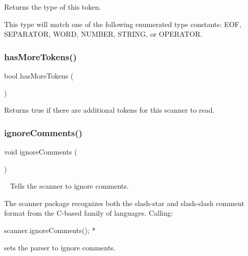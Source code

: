 Returns the type of this token. 

This type will match one of the following enumerated type constants\+: {\ttfamily E\+OF}, {\ttfamily S\+E\+P\+A\+R\+A\+T\+OR}, {\ttfamily W\+O\+RD}, {\ttfamily N\+U\+M\+B\+ER}, {\ttfamily S\+T\+R\+I\+NG}, or {\ttfamily O\+P\+E\+R\+A\+T\+OR}. \mbox{\label{classTokenScanner_af690597352ca6f48a9f86b527cd754da}} 
\subsubsection{\texorpdfstring{has\+More\+Tokens()}{hasMoreTokens()}}
{\footnotesize\ttfamily bool has\+More\+Tokens (\begin{DoxyParamCaption}{ }\end{DoxyParamCaption})}



Returns {\ttfamily true} if there are additional tokens for this scanner to read. 

\mbox{\label{classTokenScanner_a2948758a40dec8f13f9de47352afcc9f}} 
\subsubsection{\texorpdfstring{ignore\+Comments()}{ignoreComments()}}
{\footnotesize\ttfamily void ignore\+Comments (\begin{DoxyParamCaption}{ }\end{DoxyParamCaption})}



~\newline
 Tells the scanner to ignore comments. 

The scanner package recognizes both the slash-\/star and slash-\/slash comment format from the C-\/based family of languages. Calling\+:


\begin{DoxyPre}
     scanner.ignoreComments();
*\end{DoxyPre}


sets the parser to ignore comments. \mbox{\label{classTokenScanner_a1dd9d28ae227b7e0313be6dd0ecca373}} 
